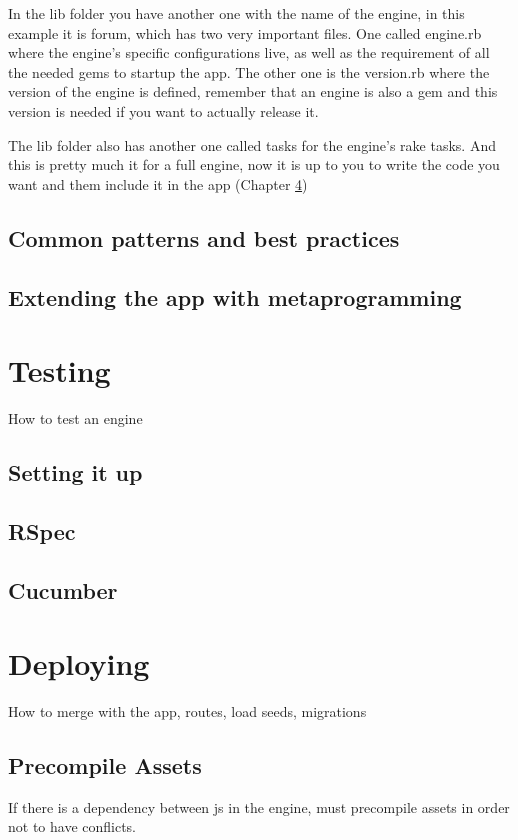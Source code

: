 \documentclass[12pt,a4paper,twoside]{book}
\begin{document}
In the lib folder you have another one with the name of the engine, in this example it is forum, which has two very important files. One called engine.rb where the engine's specific configurations live, as well as the requirement of all the needed gems to startup the app. The other one is the version.rb where the version of the engine is defined, remember that an engine is also a gem and this version is needed if you want to actually release it.

The lib folder also has another one called tasks for the engine's rake tasks. And this is pretty much it for a full engine, now it is up to you to write the code you want and them include it in the app (Chapter \ref{sec:deploy})  

\section{Common patterns and best practices}

\section{Extending the app with metaprogramming}

\chapter{Testing}

How to test an engine

\section{Setting it up}

\section{RSpec}

\section{Cucumber}

\chapter{Deploying}
\label{sec:deploy}
How to merge with the app, routes, load seeds, migrations

\section{Precompile Assets}
If there is a dependency between js in the engine, must precompile assets in order not to have conflicts.
\end{document}
